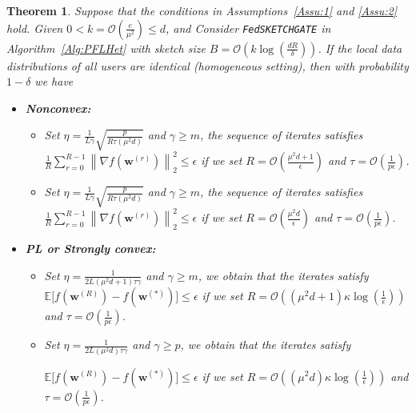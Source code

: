 \documentclass{article}
\newtheorem{theorem}{Theorem}
\begin{document}
\begin{theorem}\label{thm:hetereg_case}
  Suppose that the conditions in Assumptions~\ref{Assu:1} and \ref{Assu:2} hold. Given $0<k=\mathcal{O}\left(\frac{e}{\mu^2}\right)\leq d$, and Consider \texttt{FedSKETCHGATE} in Algorithm~\ref{Alg:PFLHet} with sketch size $B=\mathcal{O}\left(k\log\left(\frac{d R}{\delta}\right)\right)$. If the local data distributions of all users are identical (homogeneous setting), then with probability $1-\delta$ we have  
 \begin{itemize}
     \item \textbf{Nonconvex:}  
     \begin{itemize}
         \item [\texttt{PRIVIX}] Set $\eta=\frac{1}{L\gamma}\sqrt{\frac{p}{R\tau\left(\mu^2d\right)}}$ and $\gamma\geq m$, the sequence of iterates satisfies  $\frac{1}{R}\sum_{r=0}^{R-1}\left\|\nabla f({\boldsymbol{w}}^{(r)})\right\|_2^2\leq {\epsilon}$ if we set
     $R=\mathcal{O}\left(\frac{\mu^2d+1}{\epsilon}\right)$ and $ \tau=\mathcal{O}\left(\frac{1}{{p}\epsilon}\right)$.

         \item [\texttt{HEAPRIX}] Set 
 $\eta=\frac{1}{L\gamma}\sqrt{\frac{p}{R\tau\left(\mu^2d\right)}}$ and $\gamma\geq m$, the sequence of iterates satisfies  $\frac{1}{R}\sum_{r=0}^{R-1}\left\|\nabla f({\boldsymbol{w}}^{(r)})\right\|_2^2\leq {\epsilon}$ if we set
     $R=\mathcal{O}\left(\frac{\mu^2d}{\epsilon}\right)$ and $ \tau=\mathcal{O}\left(\frac{1}{{p}\epsilon}\right)$. 
     \end{itemize}
     
     \item \textbf{PL or Strongly convex:}
      \begin{itemize}
         \item [\texttt{PRIVIX}] Set $\eta=\frac{1}{2L\left({\mu^2d}+1\right)\tau\gamma}$ and $\gamma\geq m$, we obtain that the iterates satisfy $\mathbb{E}\Big[f({\boldsymbol{w}}^{(R)})-f({\boldsymbol{w}}^{(*)})\Big]\leq \epsilon$ if  we set
     $R=\mathcal{O}\left(\left(\mu^2d+1\right)\kappa\log\left(\frac{1}{\epsilon}\right)\right)$ and $ \tau=\mathcal{O}\left(\frac{1}{p\epsilon}\right)$.
          
         \item [\texttt{HEAPRIX}] Set $\eta=\frac{1}{2L\left(\mu^2d\right)\tau\gamma}$ and $\gamma\geq p$, we obtain that the iterates satisfy
         
         $\mathbb{E}\Big[f({\boldsymbol{w}}^{(R)})-f({\boldsymbol{w}}^{(*)})\Big]\leq \epsilon$ if  we set
     $R=\mathcal{O}\left(\left(\mu^2d\right)\kappa\log\left(\frac{1}{\epsilon}\right)\right)$ and $ \tau=\mathcal{O}\left(\frac{1}{p\epsilon}\right)$. 
      \end{itemize}
      

\end{itemize}
\end{theorem}
\end{document}

